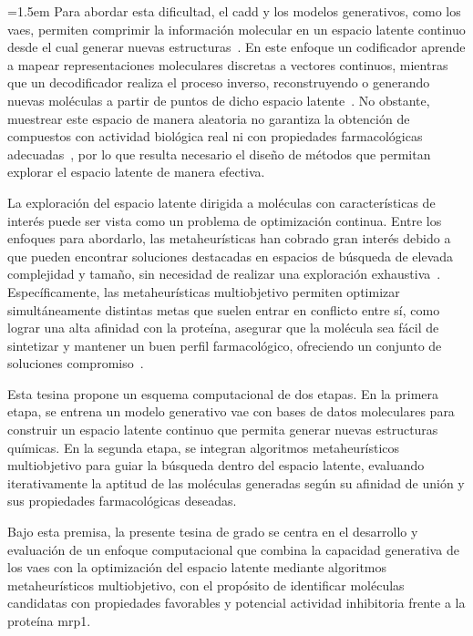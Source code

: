 {\emergencystretch=1.5em
Para abordar esta dificultad, el \gls{cadd} y los modelos generativos, como los \glspl{vae}, permiten comprimir la información molecular en un espacio latente continuo desde el cual generar nuevas estructuras~\cite{das2025generative}. En este enfoque un codificador aprende a mapear representaciones moleculares discretas a vectores continuos, mientras que un decodificador realiza el proceso inverso, reconstruyendo o generando nuevas moléculas a partir de puntos de dicho espacio latente~\cite{das2025generative}. No obstante, muestrear este espacio de manera aleatoria no garantiza la obtención de compuestos con actividad biológica real ni con propiedades farmacológicas adecuadas~\cite{das2025generative}, por lo que resulta necesario el diseño de métodos que permitan explorar el espacio latente de manera efectiva.\par}

La exploración del espacio latente dirigida a moléculas con características de interés puede ser vista como un problema de optimización continua. Entre los enfoques para abordarlo, las metaheurísticas han cobrado gran interés debido a que pueden encontrar soluciones destacadas en espacios de búsqueda de elevada complejidad y tamaño, sin necesidad de realizar una exploración exhaustiva~\cite{talbi2009metaheuristics}. Específicamente, las metaheurísticas multiobjetivo permiten optimizar simultáneamente distintas metas que suelen entrar en conflicto entre sí, como lograr una alta afinidad con la proteína, asegurar que la molécula sea fácil de sintetizar y mantener un buen perfil farmacológico, ofreciendo un conjunto de soluciones compromiso~\cite{luukkonen2023artificial, talbi2009metaheuristics}.

Esta tesina propone un esquema computacional de dos etapas. En la primera etapa, se entrena un modelo generativo \gls{vae} con bases de datos moleculares para construir un espacio latente continuo que permita generar nuevas estructuras químicas. En la segunda etapa, se integran algoritmos metaheurísticos multiobjetivo para guiar la búsqueda dentro del espacio latente, evaluando iterativamente la aptitud de las moléculas generadas según su afinidad de unión y sus propiedades farmacológicas deseadas.

Bajo esta premisa, la presente tesina de grado se centra en el desarrollo y evaluación de un enfoque computacional que combina la capacidad generativa de los \glspl{vae} con la optimización del espacio latente mediante algoritmos metaheurísticos multiobjetivo, con el propósito de identificar moléculas candidatas con propiedades favorables y potencial actividad inhibitoria frente a la proteína \gls{mrp1}.


